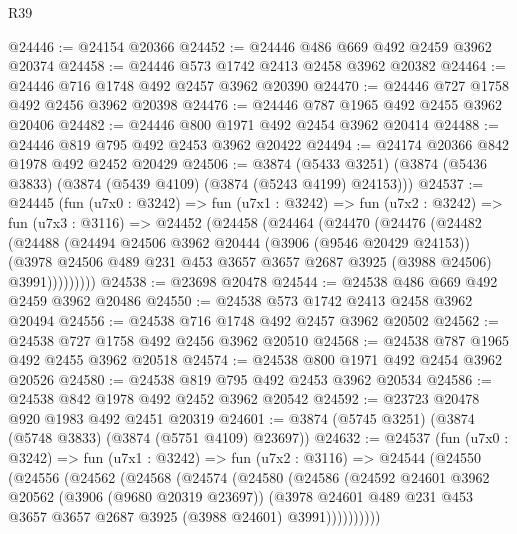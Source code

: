 \begin{lexlean}{R39}
\begin{coremodule}
@24446 := @24154 @20366
@24452 := @24446 @486 @669 @492 @2459 @3962 @20374
@24458 := @24446 @573 @1742 @2413 @2458 @3962 @20382
@24464 := @24446 @716 @1748 @492 @2457 @3962 @20390
@24470 := @24446 @727 @1758 @492 @2456 @3962 @20398
@24476 := @24446 @787 @1965 @492 @2455 @3962 @20406
@24482 := @24446 @800 @1971 @492 @2454 @3962 @20414
@24488 := @24446 @819 @795 @492 @2453 @3962 @20422
@24494 := @24174 @20366 @842 @1978 @492 @2452 @20429
@24506 := @3874
    (@5433 @3251)
    (@3874 (@5436 @3833) (@3874 (@5439 @4109) (@3874 (@5243 @4199) @24153)))
@24537 := @24445
    (fun (u7x0 : @3242) =>
    fun (u7x1 : @3242) =>
    fun (u7x2 : @3242) =>
    fun (u7x3 : @3116) =>
    @24452
      (@24458
        (@24464
          (@24470
            (@24476
              (@24482
                (@24488
                  (@24494
                    @24506
                    @3962
                    @20444
                    (@3906 (@9546 @20429 @24153))
                    (@3978
                      @24506
                      @489
                      @231
                      @453
                      @3657
                      @3657
                      @2687
                      @3925
                      (@3988 @24506)
                      @3991)))))))))
@24538 := @23698 @20478
@24544 := @24538 @486 @669 @492 @2459 @3962 @20486
@24550 := @24538 @573 @1742 @2413 @2458 @3962 @20494
@24556 := @24538 @716 @1748 @492 @2457 @3962 @20502
@24562 := @24538 @727 @1758 @492 @2456 @3962 @20510
@24568 := @24538 @787 @1965 @492 @2455 @3962 @20518
@24574 := @24538 @800 @1971 @492 @2454 @3962 @20526
@24580 := @24538 @819 @795 @492 @2453 @3962 @20534
@24586 := @24538 @842 @1978 @492 @2452 @3962 @20542
@24592 := @23723 @20478 @920 @1983 @492 @2451 @20319
@24601 := @3874 (@5745 @3251) (@3874 (@5748 @3833) (@3874 (@5751 @4109) @23697))
@24632 := @24537
    (fun (u7x0 : @3242) =>
    fun (u7x1 : @3242) =>
    fun (u7x2 : @3116) =>
    @24544
      (@24550
        (@24556
          (@24562
            (@24568
              (@24574
                (@24580
                  (@24586
                    (@24592
                      @24601
                      @3962
                      @20562
                      (@3906 (@9680 @20319 @23697))
                      (@3978
                        @24601
                        @489
                        @231
                        @453
                        @3657
                        @3657
                        @2687
                        @3925
                        (@3988 @24601)
                        @3991))))))))))

\end{coremodule}
\end{lexlean}
